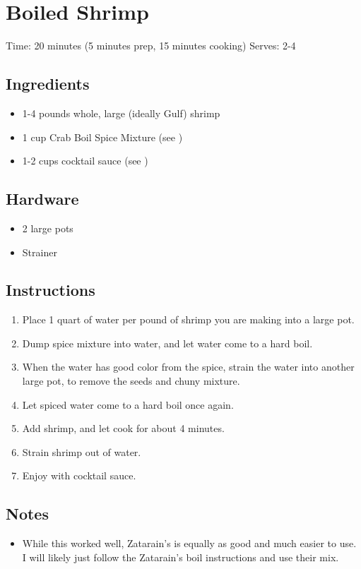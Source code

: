 \section{Boiled Shrimp}
\label{boiledShrimp}
\setcounter{secnumdepth}{0}
Time: 20 minutes (5 minutes prep, 15 minutes cooking)
Serves: 2-4

\begin{multicols}{2}
\subsection*{Ingredients}
\begin{itemize}
    \item 1-4 pounds whole, large (ideally Gulf) shrimp
    \item 1 cup Crab Boil Spice Mixture (see )
    \item 1-2 cups cocktail sauce (see )
\end{itemize}

\subsection*{Hardware}
\begin{itemize}
    \item 2 large pots
    \item Strainer
\end{itemize}
\clearpage

\subsection*{Instructions}
\begin{enumerate}
    \item Place 1 quart of water per pound of shrimp you are making into a large pot.
    \item Dump spice mixture into water, and let water come to a hard boil.
    \item When the water has good color from the spice, strain the water into another large pot, to remove the seeds and chuny mixture.
    \item Let spiced water come to a hard boil once again.
    \item Add shrimp, and let cook for about 4 minutes.
    \item Strain shrimp out of water.
    \item Enjoy with cocktail sauce.

\end{enumerate}

\subsection*{Notes}
\begin{itemize}
    \item While this worked well, Zatarain’s is equally as good and much easier to use. I will likely just follow the Zatarain’s boil instructions and use their mix.
\end{itemize}
\end{multicols}
\clearpage
